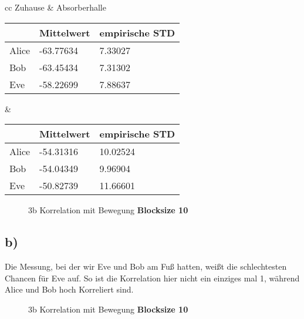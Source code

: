 \documentclass[12pt,a4paper]{article}
\begin{document}
\begin{table}[H]
\centering
\begin{tabular}{ cc }
Zuhause & Absorberhalle  \\
\begin{tabular}{l|l|l}
& Mittelwert & empirische STD \\
\hline
Alice & -63.77634 & 7.33027 \\
\hline
Bob & -63.45434 & 7.31302 \\
\hline
Eve & -58.22699 & 7.88637 \\
\end{tabular} &
\begin{tabular}{l|l|l}
& Mittelwert & empirische STD \\
\hline
Alice & -54.31316 & 10.02524 \\
\hline
Bob & -54.04349 & 9.96904 \\
\hline
Eve & -50.82739 & 11.66601 \\
\end{tabular}
\end{tabular}
\end{table}

\begin{figure}[H]
\centering
{}   \qquad
{}
\caption{3b Korrelation mit Bewegung \textbf{Blocksize 10}}
\label{fig:5}
\end{figure}
\subsection*{b)}
Die Messung, bei der wir Eve und Bob am Fuß hatten, weißt die schlechtesten Chancen für Eve auf. So ist die Korrelation hier nicht ein einziges mal 1, während Alice und Bob hoch Korreliert sind.
\begin{figure}[H]
\centering
{} \qquad
{}  
\caption{3b Korrelation mit Bewegung  \textbf{Blocksize 10}}
\label{fig:6}
\end{figure}
\end{document}
